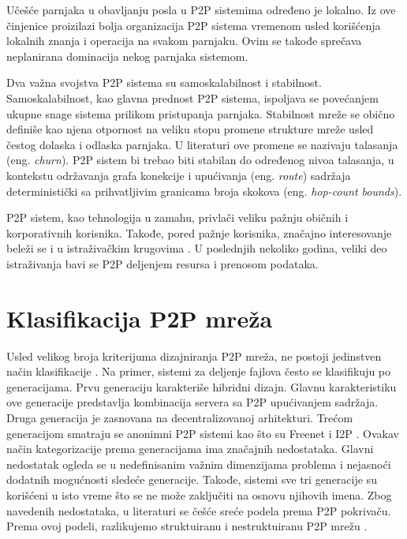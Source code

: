 \documentclass[12pt,oneside]{memoir}
\begin{document}
Učešće parnjaka u obavljanju posla u P2P sistemima određeno je lokalno. Iz ove činjenice proizilazi bolja organizacija P2P sistema vremenom usled korišćenja lokalnih znanja i operacija na svakom parnjaku. Ovim se takođe sprečava neplanirana dominacija nekog parnjaka sistemom.

Dva važna svojstva P2P sistema su samoskalabilnost i stabilnost. 
Samoskalabilnost, kao glavna prednost P2P sistema,
ispoljava se povećanjem ukupne snage sistema prilikom pristupanja parnjaka. Stabilnost mreže se obično definiše kao njena otpornost na veliku stopu promene strukture mreže usled čestog dolaska i odlaska parnjaka. U literaturi ove promene se nazivaju talasanja (eng. \textit{churn}). P2P sistem bi trebao biti stabilan do određenog nivoa talasanja, u kontekstu održavanja grafa konekcije i upućivanja (eng. \textit{route}) sadržaja deterministički sa prihvatljivim granicama broja skokova (eng. \textit{hop-count bounds}).


P2P sistem, kao tehnologija u zamahu, privlači veliku pažnju običnih i korporativnih korisnika. Takođe, pored pažnje korisnika, značajno interesovanje beleži se i u istraživačkim krugovima \cite{DeBoever07}. U poslednjih nekoliko godina, veliki deo istraživanja bavi se P2P deljenjem resursa i prenosom podataka. 

\section{Klasifikacija P2P mreža}
\label{P2P.2}

Usled velikog broja kriterijuma dizajniranja P2P mreža, ne postoji jedinstven način klasifikacije \cite{Shen:2009}. Na primer, sistemi za deljenje fajlova često se klasifikuju po generacijama. Prvu generaciju karakteriše hibridni dizajn. Glavnu karakteristiku ove generacije predstavlja kombinacija servera sa P2P upućivanjem sadržaja. Druga generacija je zasnovana na decentralizovanoj arhitekturi. Trećom generacijom smatraju se anonimni P2P sistemi kao što su Freenet \cite{Clarke_2001} i I2P \cite{I2P}. Ovakav način kategorizacije prema generacijama ima značajnih nedostataka. Glavni nedostatak ogleda se u nedefinisanim važnim dimenzijama problema i nejasnoći dodatnih mogućnosti sledeće generacije. Takođe, sistemi sve tri generacije su korišćeni u isto vreme što se ne može zaključiti na osnovu njihovih imena. Zbog navedenih nedostataka, u literaturi se češće sreće podela prema P2P pokrivaču. Prema ovoj podeli, razlikujemo struktuiranu i nestruktuiranu P2P mrežu  \cite{Prasanna_Ganesan_2004}.
\end{document}
